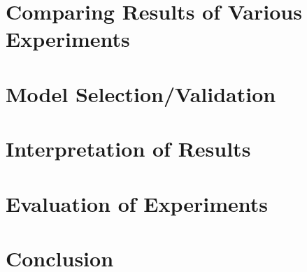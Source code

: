 \section{Comparing Results of Various Experiments}

\section{Model Selection/Validation}

\section{Interpretation of Results}

\section{Evaluation of Experiments}

\section{Conclusion}